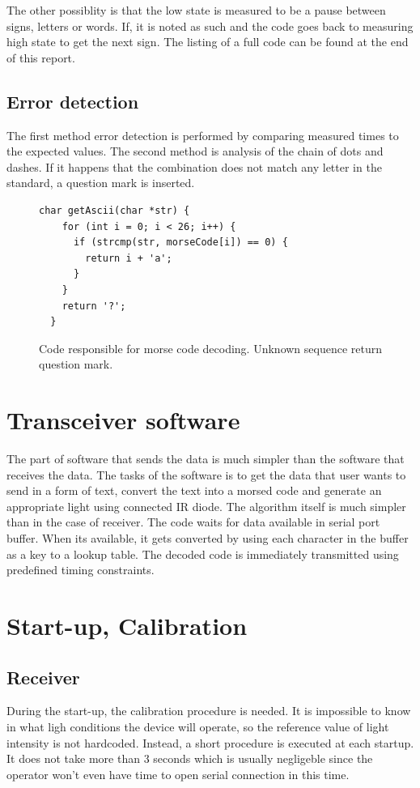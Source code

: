 \documentclass[12pt]{article}
\begin{document}
  The other possiblity is that the low state is measured to be a pause between signs, letters or words. If, it is noted as such and the code goes back to measuring high state to get the next sign.
  The listing of a full code can be found at the end of this report.

  \subsection{Error detection}
  The first method error detection is performed by comparing measured times to the expected values.
  The second method is analysis of the chain of dots and dashes. If it happens that the combination does not match any letter in the standard, a question mark is inserted.
  \begin{figure}[h]
  \begin{lstlisting}[autogobble,style=CStyle]
  char getAscii(char *str) {
    for (int i = 0; i < 26; i++) {
      if (strcmp(str, morseCode[i]) == 0) {
        return i + 'a';
      }
    }
    return '?';
  }
  \end{lstlisting}
    \caption{Code responsible for morse code decoding. Unknown sequence return question mark.}
  \end{figure}
	
	\section{Transceiver software}
  The part of software that sends the data is much simpler than the software that receives the data.
  The tasks of the software is to get the data that user wants to send in a form of text, convert the text into a morsed code 
  and generate an appropriate light using connected IR diode. 
  The algorithm itself is much simpler than in the case of receiver. The code waits for data available in serial port buffer.
  When its available, it gets converted by using each character in the buffer as a key to a lookup table.
  The decoded code is immediately transmitted using predefined timing constraints.

	\section{Start-up, Calibration}
  \subsection{Receiver}
  During the start-up, the calibration procedure is needed. It is impossible to know in what ligh conditions the device will operate, so the reference value of light intensity is not hardcoded.
  Instead, a short procedure is executed at each startup. It does not take more than 3 seconds which is usually negligeble since the operator won't even have time to open serial connection in this time.
\end{document}

